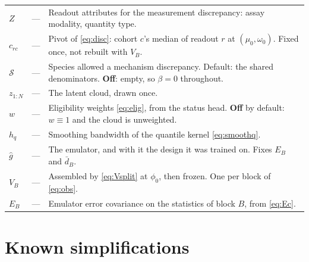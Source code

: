 \documentclass[11pt]{article}
\begin{document}
\begin{center}
\begin{tabularx}{\textwidth}{@{}llX@{}}
$Z$ & --- & Readout attributes for the measurement discrepancy: assay modality, quantity type. \\
$c_{rc}$ & --- & Pivot of \eqref{eq:disc}: cohort $c$'s median of readout $r$ at $(\mu_0,\omega_0)$. Fixed once, not rebuilt with $V_B$. \\
$\mathcal{S}$ & --- & Species allowed a mechanism discrepancy. Default: the shared denominators. \textbf{Off}: empty, so $\beta=0$ throughout. \\
$z_{1:N}$ & --- & The latent cloud, drawn once. \\
$w$ & --- & Eligibility weights \eqref{eq:elig}, from the status head. \textbf{Off} by default: $w\equiv1$ and the cloud is unweighted. \\
$h_q$ & --- & Smoothing bandwidth of the quantile kernel \eqref{eq:smoothq}. \\
$\widehat g$ & --- & The emulator, and with it the design it was trained on. Fixes $E_B$ and $\bar d_B$. \\
$V_{B}$ & --- & Assembled by \eqref{eq:Vsplit} at $\phi_0$, then frozen. One per block of \eqref{eq:obs}. \\
$E_B$ & --- & Emulator error covariance on the statistics of block $B$, from \eqref{eq:Ec}. \\
\bottomrule
\end{tabularx}
\end{center}

\section{Known simplifications}
\end{document}
